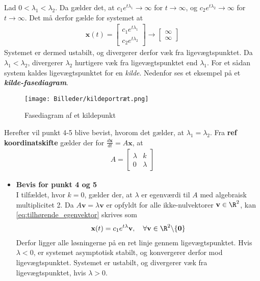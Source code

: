 \begin{bev}
\begin{itemize}
    Lad $0<\lambda_1<\lambda_2$. Da gælder det, at $c_1e^{t\lambda_1} \to \infty$ for $t\to \infty$, og $c_2e^{t\lambda_2} \to \infty$ for $t \to \infty$. Det må derfor gælde for systemet at 
    \begin{align*}
        \textbf{x}(t) = \begin{bmatrix} c_1e^{t\lambda_1} \\ c_2e^{t\lambda_2}\end{bmatrix} \to \begin{bmatrix} \infty \\ \infty \end{bmatrix}
    \end{align*}
    Systemet er dermed ustabilt, og divergerer derfor væk fra ligevægtspunktet. 
    Da $\lambda_1<\lambda_2$, divergerer $\lambda_2$ hurtigere væk fra ligevægtspunktet end $\lambda_1$.
    For et sådan system kaldes ligevægtspunktet for en \textit{kilde}. Nedenfor ses et eksempel på et \textbf{\textit{kilde-fasediagram}}.
    \begin{figure}[H]
        \centering
        \texttt{[image: Billeder/kildeportræt.png]}
        \caption{Fasediagram af et kildepunkt}
        \label{fig:kildeportræt_bevis}
    \end{figure}
\end{itemize}
Herefter vil punkt 4-5 blive bevist, hvorom det gælder, at $\lambda_1 = \lambda_2$. Fra \textbf{ref koordinatskifte} gælder der for $\frac{d\textbf{x}}{dt} = A\textbf{x}$, at
    \begin{align*}A=
        \begin{bmatrix}
        \lambda & k \\
        0 & \lambda
        \end{bmatrix}
    \end{align*}
\begin{itemize}
    \item [] \textbf{Bevis for punkt 4 og 5}\\
    I tilfældet, hvor $k=0$, gælder der, at $\lambda$ er egenværdi til $A$ med algebraisk multiplicitet 2. Da $A\textbf{v}=\lambda\textbf{v}$ er opfyldt for alle ikke-nulvektorer $\textbf{v}\in \R^2$, kan \eqref{eq:tilhørende_egenvektor} skrives som 
    \begin{align*}
        \textbf{x}(t) = c_1e^{t\lambda}\textbf{v}, \quad   \forall\textbf{v}\in\R^2 \backslash \{\textbf{0}\}
    \end{align*}
    Derfor ligger alle løsningerne på en ret linje gennem ligevægtspunktet. Hvis $\lambda<0$, er systemet asymptotisk stabilt, og konvergerer derfor mod ligevægtspunktet. Systemet er ustabilt, og divergerer væk fra ligevægtspunktet, hvis $\lambda>0$. 

\end{itemize}
\end{bev}
